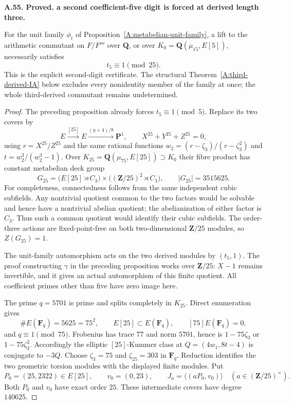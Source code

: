 \documentclass[11pt,oneside]{article}
\makeatletter
\newcounter{statementanchor}
\newenvironment{statement}[3]{%
 \refstepcounter{statementanchor}\def\@currentlabel{#1}%
 \par\addvspace{9pt}\noindent
 \textbf{#1. #2. #3.}\par\nobreak\noindent\ignorespaces
}{\par\addvspace{5pt}}
\makeatother
\begin{document}
\begin{statement}{A.55}{Proved}{a second coefficient-five digit is forced at derived length three}
\label{st:A.55}
\label{A:third-derived-second-digit}
For the unit family $\phi_t$ of
Proposition~\ref{A:metabelian-unit-family}, a lift to the
arithmetic commutant on $F/F'''$ over $\mathbf Q$, or over
$K_0=\mathbf Q(\mu_{15},E[5])$, necessarily satisfies
\[
                            t_5\equiv1\pmod{25}.
\]
This is the explicit second-digit certificate. The
structural Theorem~\ref{A:third-derived-IA} below
excludes every nonidentity member of the family at once;
the whole third-derived commutant remains undetermined.
\end{statement}
\begin{proof}
The preceding proposition already forces
$t_5\equiv1\pmod5$. Replace its two covers by
\[
 E\xrightarrow{[25]}E\xrightarrow{(y+4)/8}\mathbf P^1,
 \qquad X^{25}+Y^{25}+Z^{25}=0,
\]
using $r=X^{25}/Z^{25}$ and the same rational functions
$w_2=(r-\zeta_3)/(r-\zeta_3^2)$ and $t=w_2^3/(w_2^3-1)$.
Over $K_{25}=\mathbf Q(\mu_{75},E[25])\supset K_0$ their fibre product
has constant metabelian deck group
\[
 G_{25}=
 \bigl(E[25]\rtimes C_3\bigr)
       \times\bigl((\mathbf Z/25)^2\rtimes C_3\bigr),
             \qquad |G_{25}|=3515625.
\]
For completeness, connectedness follows from the same
independent cubic subfields. Any nontrivial quotient
common to the two factors would be solvable and hence
have a nontrivial abelian quotient; the abelianization
of either factor is $C_3$. Thus such a common quotient
would identify their cubic subfields. The order-three
actions are fixed-point-free on both two-dimensional
$\mathbf Z/25$ modules, so $Z(G_{25})=1$.

The unit-family automorphism acts on the two derived
modules by $(t_5,1)$. The proof constructing $\gamma$
in the preceding proposition works over $\mathbf Z/25$:
$X-1$ remains invertible, and it gives an actual
automorphism of this finite quotient. All coefficient
primes other than five have zero image here.

The prime $q=5701$ is prime and splits completely in
$K_{25}$. Direct enumeration gives
\[
 \#E(\mathbf F_q)=5625=75^2,\qquad
 E[25]\subset E(\mathbf F_q),\qquad
 [75]E(\mathbf F_q)=0,
\]
and $q\equiv1\pmod{75}$. Frobenius has trace $77$ and
norm $5701$, hence is $1-75\zeta_3$ or
$1-75\zeta_3^2$. Accordingly the elliptic
$[25]$-Kummer class at $Q=(4w_1,8t-4)$ is conjugate
to $-3Q$. Choose $\zeta_3=75$ and $\zeta_{25}=303$
in $\mathbf F_q$. Reduction identifies the two
geometric torsion modules with the displayed finite
modules. Put
\[
 P_0=(25,2322)\in E[25],\qquad v_0=(0,23),\qquad
 J_a=\langle(aP_0,v_0)\rangle\quad(a\in(\mathbf Z/25)^\times).
\]
Both $P_0$ and $v_0$ have exact order $25$.
These intermediate covers have degree $140625$.


\end{proof}
\end{document}
